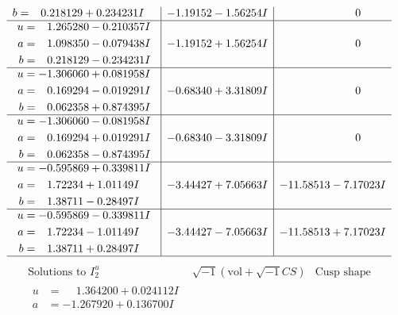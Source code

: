 \documentclass[1p]{elsarticle_modified}
\theoremstyle{definition}
\newcommand{\I}{\sqrt{-1}}
\begin{document}
$$\begin{array}{c|c|c}
\begin{aligned}
b &= \phantom{-}0.218129 + 0.234231 I\end{aligned}
 & -1.19152 - 1.56254 I & \phantom{-0.000000 } 0 \\ \hline\begin{aligned}
u &= \phantom{-}1.265280 - 0.210357 I \\
a &= \phantom{-}1.098350 - 0.079438 I \\
b &= \phantom{-}0.218129 - 0.234231 I\end{aligned}
 & -1.19152 + 1.56254 I & \phantom{-0.000000 } 0 \\ \hline\begin{aligned}
u &= -1.306060 + 0.081958 I \\
a &= \phantom{-}0.169294 - 0.019291 I \\
b &= \phantom{-}0.062358 + 0.874395 I\end{aligned}
 & -0.68340 + 3.31809 I & \phantom{-0.000000 } 0 \\ \hline\begin{aligned}
u &= -1.306060 - 0.081958 I \\
a &= \phantom{-}0.169294 + 0.019291 I \\
b &= \phantom{-}0.062358 - 0.874395 I\end{aligned}
 & -0.68340 - 3.31809 I & \phantom{-0.000000 } 0 \\ \hline\begin{aligned}
u &= -0.595869 + 0.339811 I \\
a &= \phantom{-}1.72234 + 1.01149 I \\
b &= \phantom{-}1.38711 - 0.28497 I\end{aligned}
 & -3.44427 + 7.05663 I & -11.58513 - 7.17023 I \\ \hline\begin{aligned}
u &= -0.595869 - 0.339811 I \\
a &= \phantom{-}1.72234 - 1.01149 I \\
b &= \phantom{-}1.38711 + 0.28497 I\end{aligned}
 & -3.44427 - 7.05663 I & -11.58513 + 7.17023 I\\
 \hline 
 \end{array}$$\newpage$$\begin{array}{c|c|c}  
\text{Solutions to }I^u_{2}& \I (\text{vol} + \sqrt{-1}CS) & \text{Cusp shape}\\
 \hline 
\begin{aligned}
u &= \phantom{-}1.364200 + 0.024112 I \\
a &= -1.267920 + 0.136700 I \\

\end{aligned}
\end{array}$$
\end{document}
